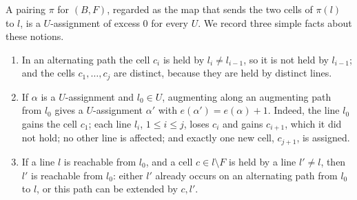 A pairing $\pi$ for $(B,F)$, regarded as the map that sends the two cells of $\pi(l)$ to $l$, is a
$U$-assignment of excess $0$ for every $U$. We record three simple facts about these notions.
\begin{enumerate}[label=\textup{(\roman*)}]
\item In an alternating path the cell $c_i$ is held by $l_i\ne l_{i-1}$, so it is not held by $l_{i-1}$;
      and the cells $c_1,\dots,c_j$ are distinct, because they are held by distinct lines.
\item If $\alpha$ is a $U$-assignment and $l_0\in U$, augmenting along an augmenting path from $l_0$ gives a
      $U$-assignment $\alpha'$ with $e(\alpha')=e(\alpha)+1$. Indeed, the line $l_0$ gains the cell $c_1$;
      each line $l_i$, $1\le i\le j$, loses $c_i$ and gains $c_{i+1}$, which it did not hold; no other line
      is affected; and exactly one new cell, $c_{j+1}$, is assigned.
\item If a line $l$ is reachable from $l_0$, and a cell $c\in l\setminus F$ is held by a line $l'\ne l$,
      then $l'$ is reachable from $l_0$: either $l'$ already occurs on an alternating path from $l_0$ to
      $l$, or this path can be extended by $c,l'$.
\end{enumerate}

